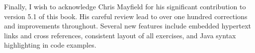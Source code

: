 Finally, I wish to acknowledge Chris Mayfield for his significant
contribution to version 5.1 of this book. His careful review
lead to over one hundred corrections and improvements throughout.
Several new features include embedded hypertext links and cross
references, consistent layout of all exercises, and Java syntax
highlighting in code examples.

